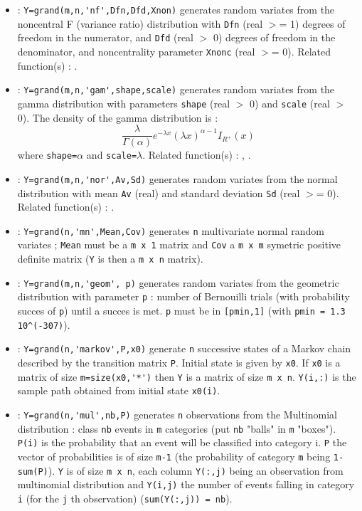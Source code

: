 \begin{itemize}
\item {} 
  : \verb!Y=grand(m,n,'nf',Dfn,Dfd,Xnon)! generates random variates from the noncentral 
  F (variance ratio)  distribution with \verb!Dfn! (real $>$= 1) degrees of freedom 
  in the numerator, and \verb!Dfd! (real $>$ 0) degrees of freedom in the denominator, 
  and noncentrality parameter \verb!Xnonc! (real $>$= 0). 
  Related function(s) :  .
  
\item {} : \verb!Y=grand(m,n,'gam',shape,scale)! generates random variates from the gamma 
  distribution with parameters \verb!shape! (real $>$ 0) and \verb!scale! 
  (real $>$ 0). The density of the gamma distribution is :
  \[
  \frac{\lambda}{\Gamma(\alpha)} e^{-\lambda x} (\lambda x)^{\alpha-1} I_{{R}^+}(x)
  \]
  where \verb+shape=+$\alpha$ and \verb+scale=+$\lambda$.
  Related function(s) :  ,  .
  
\item {} 
  : \verb!Y=grand(m,n,'nor',Av,Sd)! generates random variates from the normal 
  distribution with mean \verb!Av! (real)  and standard deviation \verb!Sd!
  (real $>$= 0). Related function(s) :  .
  
\item {} : \verb!Y=grand(n,'mn',Mean,Cov)! generates  \verb!n! multivariate normal random variates ; 
  \verb!Mean! must be a \verb!m x 1! matrix and \verb!Cov! a  \verb!m x m! 
  symetric positive definite matrix  (\verb!Y! is then a  \verb!m x n! matrix).
\item {} : \verb!Y=grand(m,n,'geom', p)! generates random variates from the geometric
  distribution with parameter \verb!p! : number of Bernouilli trials (with 
  probability succes of \verb!p!) until a succes is met. \verb!p! must 
  be in \verb![pmin,1]! (with \verb!pmin = 1.3 10^(-307)!).
\item {} 
  : \verb!Y=grand(n,'markov',P,x0)! generate \verb!n! successive states of a Markov chain 
  described  by the transition matrix \verb!P!. Initial state is  given by 
  \verb!x0!. If \verb!x0! is a matrix of size \verb!m=size(x0,'*')! 
  then \verb!Y! is a matrix of size \verb!m x n!. \verb!Y(i,:)! is the sample 
  path  obtained from initial state \verb!x0(i)!.
\item {} 
  : \verb!Y=grand(n,'mul',nb,P)! generates \verb!n! observations from the Multinomial 
  distribution :  class \verb!nb! events in \verb!m! categories (put \verb!nb!
  "balls" in \verb!m! "boxes"). \verb!P(i)! is the probability 
  that an event will be classified into category i. \verb!P! the vector of probabilities
  is of size  \verb!m-1! (the probability of category \verb!m! being \verb!1-sum(P)!).
  \verb!Y! is of size \verb!m x n!, each column \verb!Y(:,j)! being an observation 
  from multinomial distribution and \verb!Y(i,j)! the number of events falling in category 
  \verb!i! (for the \verb!j! th observation) (\verb!sum(Y(:,j)) = nb!).
  

\end{itemize}
